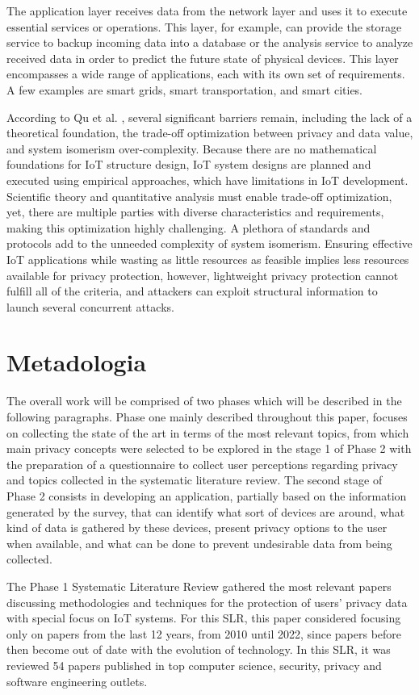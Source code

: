 \documentclass[conference]{IEEEtran}
\begin{document}
The application layer receives data from the network layer and uses it to
execute essential services or operations. This layer, for example, can provide
the storage service to backup incoming data into a database or the analysis
service to analyze received data in order to predict the future state of
physical devices. This layer encompasses a wide range of applications, each
with its own set of requirements. A few examples are smart grids, smart
transportation, and smart cities.

According to Qu et al. \cite{Qu2018Privacy}, several significant barriers
remain, including the lack of a theoretical foundation, the trade-off optimization
between privacy and data value, and system isomerism over-complexity. Because
there are no mathematical foundations for IoT structure design, IoT system
designs are planned and executed using empirical approaches, which have
limitations in IoT development. Scientific theory and quantitative analysis
must enable trade-off optimization, yet, there are multiple parties with
diverse characteristics and requirements, making this optimization highly
challenging. A plethora of standards and protocols add to the unneeded complexity
of system isomerism. Ensuring effective IoT applications while wasting as
little resources as feasible implies less resources available for privacy
protection, however, lightweight privacy protection cannot fulfill all of
the criteria, and attackers can exploit structural information to launch
several concurrent attacks.

\section{Metadologia}

The overall work will be comprised of two phases which will be described
in the following paragraphs. Phase one mainly described throughout this
paper, focuses on collecting the state of the art in terms of the most relevant
topics, from which main privacy concepts were selected to be explored in
the stage 1 of Phase 2 with the preparation of a questionnaire to collect
user perceptions regarding privacy and topics collected in the systematic
literature review. The second stage of Phase 2 consists in developing an
application, partially based on the information generated by the survey,
that can identify what sort of devices are around, what kind of data is
gathered by these devices, present privacy options to the user when available,
and what can be done to prevent undesirable data from being collected.
\par
The Phase 1 Systematic Literature Review gathered the most relevant papers
discussing methodologies and techniques for the protection of users' privacy
data with special focus on IoT systems. For this SLR, this paper considered
focusing only on papers from the last 12 years, from 2010 until 2022, since
papers before then become out of date with the evolution of technology.
In this SLR, it was reviewed 54 papers published in top computer science,
security, privacy and software engineering outlets.
\end{document}
